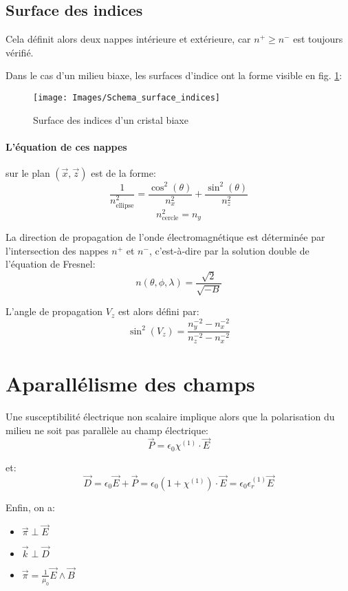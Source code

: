 \documentclass[a4paper,11pt]{report}
\begin{document}
\subsection{Surface des indices}
Cela définit alors deux nappes intérieure et extérieure, car $n^+ \geq n^-$ est toujours vérifié.

Dans le cas d'un milieu biaxe, les surfaces d'indice ont la forme visible en fig. \ref{surf_indices}:

\begin{figure}[h]
    \begin{center}
        \texttt{[image: Images/Schema\_surface\_indices]}
        \caption{Surface des indices d'un cristal biaxe}
        \label{surf_indices}
    \end{center}
\end{figure}

\paragraph{L'équation de ces nappes} sur le plan $(\vec x, \vec z)$ est de la forme:
\[  \frac{1}{n^2_\text{ellipse}} = \frac{\cos^2(\theta)}{n^2_x} + \frac{\sin^2(\theta)}{n^2_z} \]
\[  n^2_\text{cercle} = n_y \]

La direction de propagation de l'onde électromagnétique est déterminée par l'intersection des nappes $n^+$ et $n^-$, c'est-à-dire par la solution double de l'équation de Fresnel:
\[  n(\theta, \phi, \lambda) = \dfrac{\sqrt 2}{\sqrt{-B}} \]

L'angle de propagation $V_z$ est alors défini par:
\[ \sin^2(V_z) = \frac{n_y^{-2}-n_x^{-2}}{n_z^{-2}-n_x^{-2}} \]


\section{Aparallélisme des champs}
Une susceptibilité électrique non scalaire implique alors que la polarisation du milieu ne soit pas parallèle au champ électrique:
\[\vec{P} = \epsilon_0 \chi^{(1)} \cdot\vec{E}\]

et: 
\[\vec{D} = \epsilon_0 \vec{E} + \vec{P}
          = \epsilon_0 (1+\chi^{(1)}) \cdot\vec{E}
          = \epsilon_0 \epsilon_r^{(1)} \vec{E}\]

Enfin, on a:
\begin{itemize}
    \item $\vec{\pi} \perp \vec{E}$
    \item $\vec{k}   \perp \vec{D}$
    \item $\vec{\pi} = \frac{1}{\mu_0} \vec{E}\wedge \vec{B}$
\end{itemize}
\end{document}
